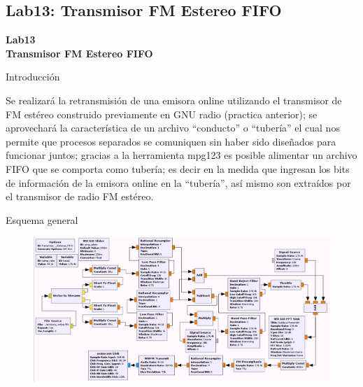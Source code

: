 \subsection{Lab13: Transmisor FM Estereo FIFO}

\begin{frame}{}


\bfseries{\textrm{\LARGE Lab13\\ \Large Transmisor FM Estereo FIFO}}
\raggedright
\end{frame}

\begin{frame}{Introducción}


Se realizará la retransmisión de una emisora online utilizando el transmisor de FM estéreo construido previamente en GNU radio (practica anterior); se aprovechará  la característica de un archivo “conducto” o “tubería” el cual nos permite que procesos separados se comuniquen sin haber sido diseñados para funcionar juntos; gracias a la herramienta mpg123 es posible alimentar un archivo FIFO que se comporta como tubería; es decir en la medida que ingresan los bits de información de la emisora online en la “tubería”, así mismo son extraídos por el transmisor de radio FM estéreo.

\end{frame}

\begin{frame}{Esquema general}
    
\begin{figure}[H]
\centering
\vspace{-3mm}
\includegraphics[width=\textwidth]{parte3/lab13/pdf/lab13_1.pdf}
\end{figure}
    
\end{frame}

